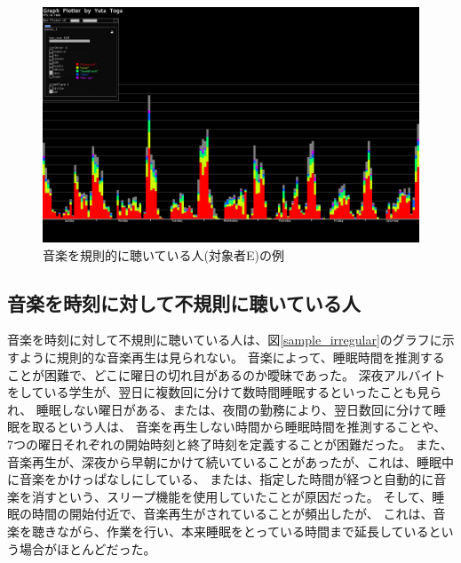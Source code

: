 \documentclass[a4paper, 11pt, onecolumn, report]{jsarticle}
\begin{document}
\begin{figure}[h]
\begin{center}
\includegraphics[width=14cm]{sample_regular.jpg}
\caption{音楽を規則的に聴いている人(対象者E)の例}
\label{sample_regular}
\end{center}
\end{figure}

\subsection{音楽を時刻に対して不規則に聴いている人}
音楽を時刻に対して不規則に聴いている人は、図\ref{sample_irregular}のグラフに示すように規則的な音楽再生は見られない。
音楽によって、睡眠時間を推測することが困難で、どこに曜日の切れ目があるのか曖昧であった。
深夜アルバイトをしている学生が、翌日に複数回に分けて数時間睡眠するといったことも見られ、
睡眠しない曜日がある、または、夜間の勤務により、翌日数回に分けて睡眠を取るという人は、
音楽を再生しない時間から睡眠時間を推測することや、
7つの曜日それぞれの開始時刻と終了時刻を定義することが困難だった。
また、音楽再生が、深夜から早朝にかけて続いていることがあったが、これは、睡眠中に音楽をかけっぱなしにしている、
または、指定した時間が経つと自動的に音楽を消すという、スリープ機能を使用していたことが原因だった。
そして、睡眠の時間の開始付近で、音楽再生がされていることが頻出したが、
これは、音楽を聴きながら、作業を行い、本来睡眠をとっている時間まで延長しているという場合がほとんどだった。
\end{document}
